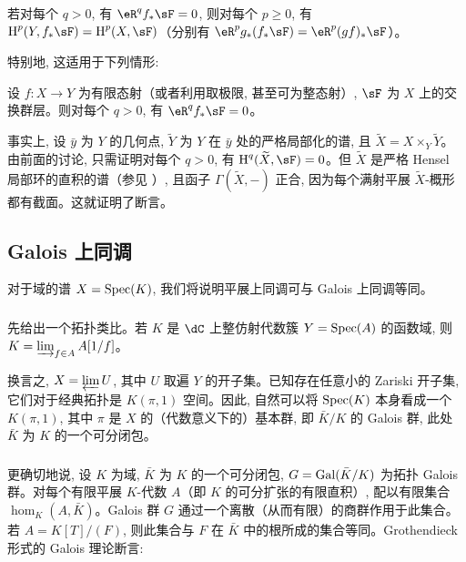 \begin{corollary}\label{I:2-3-5}
若对每个 $q>0$, 有 $\eR^qf_*\sF=0$, 则对每个 $p\geqslant0$, 有 $\h^p(Y,f_*\sF)=\h^p(X,\sF)$（分别有 $\eR^pg_*(f_*\sF)=\eR^p(gf)_*\sF$）。
\end{corollary}

特别地, 这适用于下列情形:

\begin{proposition}\label{I:2-3-6}
设 $f:X\to Y$ 为有限态射（或者利用取极限, 甚至可为整态射）, $\sF$ 为 $X$ 上的交换群层。则对每个 $q>0$, 有 $\eR^qf_*\sF=0$。
\end{proposition}

事实上, 设 $\bar y$ 为 $Y$ 的几何点, $\widetilde Y$ 为 $Y$ 在 $\bar y$ 处的严格局部化的谱, 且 $\widetilde X=X\times_Y\widetilde Y$。由前面的讨论, 只需证明对每个 $q>0$, 有 $\h^q(\widetilde X,\sF)=0$。但 $\widetilde X$ 是严格 Hensel 局部环的直积的谱（参见 \cite[I]{ra70}）, 且函子 $\Gamma(\widetilde X,-)$ 正合, 因为每个满射平展 $\widetilde X$-概形都有截面。这就证明了断言。

\subsection{Galois 上同调}\label{I:2-4}

对于域的谱 $X=\operatorname{Spec}(K)$, 我们将说明平展上同调可与 Galois 上同调等同。

\subsubsection{}\label{I:2-4-1}

先给出一个拓扑类比。若 $K$ 是 $\dC$ 上整仿射代数簇 $Y=\operatorname{Spec}(A)$ 的函数域, 则 $K=\varinjlim_{f\in A}A[1/f]$。

换言之, $X=\varprojlim U$, 其中 $U$ 取遍 $Y$ 的开子集。已知存在任意小的 Zariski 开子集, 它们对于经典拓扑是 $K(\pi,1)$ 空间。因此, 自然可以将 $\operatorname{Spec}(K)$ 本身看成一个 $K(\pi,1)$, 其中 $\pi$ 是 $X$ 的（代数意义下的）基本群, 即 $\bar K/K$ 的 Galois 群, 此处 $\bar K$ 为 $K$ 的一个可分闭包。

\subsubsection{}\label{I:2-4-2}

更确切地说, 设 $K$ 为域, $\bar K$ 为 $K$ 的一个可分闭包, $G=\operatorname{Gal}(\bar K/K)$ 为拓扑 Galois 群。对每个有限平展 $K$-代数 $A$（即 $K$ 的可分扩张的有限直积）, 配以有限集合 $\hom_K(A,\bar K)$。Galois 群 $G$ 通过一个离散（从而有限）的商群作用于此集合。若 $A=K[T]/(F)$, 则此集合与 $F$ 在 $\bar K$ 中的根所成的集合等同。Grothendieck 形式的 Galois 理论断言:

